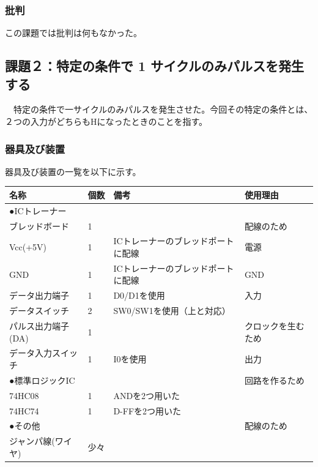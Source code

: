 \documentclass{scrartcl}
\begin{document}
\subsubsection{}
\label{sec:orgc5e59b1}
\subsubsection{批判}
\label{sec:org5312a2e}
この課題では批判は何もなかった。\\

\subsection{課題２：特定の条件で 1 サイクルのみパルスを発生する}
\label{sec:org46843f7}
　特定の条件で一サイクルのみパルスを発生させた。今回その特定の条件とは、２つの入力がどちらもHになったときのことを指す。\\
\subsubsection{器具及び装置}
\label{sec:org93b94f5}
器具及び装置の一覧を以下に示す。\\
\begin{center}
\begin{tabular}{|l|l|l|l|}
\hline
名称 & 個数 & 備考 & 使用理由\\
\hline
●ICトレーナー &  &  & \\
ブレッドボード & 1 &  & 配線のため\\
Vcc(+5V) & 1 & ICトレーナーのブレッドポートに配線 & 電源\\
GND & 1 & ICトレーナーのブレッドポートに配線 & GND\\
データ出力端子 & 1 & D0/D1を使用 & 入力\\
データスイッチ & 2 & SW0/SW1を使用（上と対応） & \\
パルス出力端子(DA) & 1 &  & クロックを生むため\\
データ入力スイッチ & 1 & I0を使用 & 出力\\
\hline
●標準ロジックIC &  &  & 回路を作るため\\
74HC08 & 1 & ANDを2つ用いた & \\
74HC74 & 1 & D-FFを2つ用いた & \\
\hline
●その他 &  &  & 配線のため\\
ジャンパ線(ワイヤ) & 少々 &  & \\
\hline
\end{tabular}
\end{center}
\end{document}
